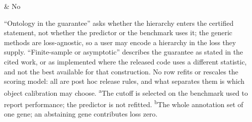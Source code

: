 \begin{table}[!t]
\begin{tabular}
 & No \\
\bottomrule
\end{tabular}
\par\vspace{3pt}\begin{minipage}{\linewidth}\footnotesize
``Ontology in the guarantee'' asks whether the hierarchy enters the certified statement, not whether the predictor or the benchmark uses it; the generic methods are loss-agnostic, so a user may encode a hierarchy in the loss they supply. ``Finite-sample or asymptotic'' describes the guarantee as stated in the cited work, or as implemented where the released code uses a different statistic, and not the best available for that construction. No row refits or rescales the scoring model: all are post hoc release rules, and what separates them is which object calibration may choose. \textsuperscript{a}The cutoff is selected on the benchmark used to report performance; the predictor is not refitted. \textsuperscript{b}The whole annotation set of one gene; an abstaining gene contributes loss zero.
\end{minipage}
\end{table}
